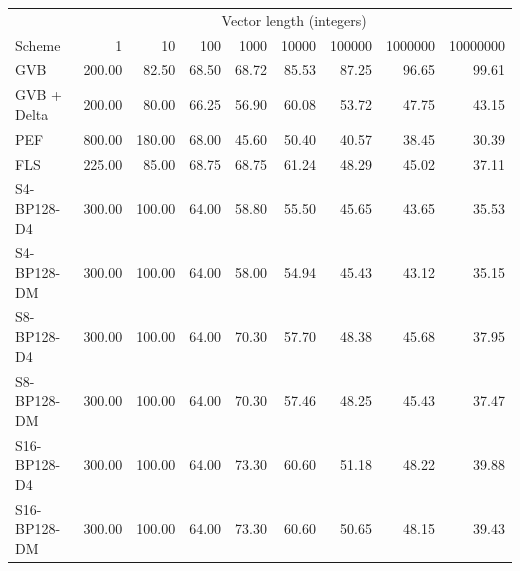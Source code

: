\begin{tabular}{lrrrrrrrr}
\toprule
 & \multicolumn{8}{c}{Vector length (integers)} \\
Scheme & 1 & 10 & 100 & 1000 & 10000 & 100000 & 1000000 & 10000000 \\
\midrule
GVB & 200.00 & 82.50 & 68.50 & 68.72 & 85.53 & 87.25 & 96.65 & 99.61 \\
GVB + Delta & 200.00 & 80.00 & 66.25 & 56.90 & 60.08 & 53.72 & 47.75 & 43.15 \\
PEF & 800.00 & 180.00 & 68.00 & 45.60 & 50.40 & 40.57 & 38.45 & 30.39 \\
FLS & 225.00 & 85.00 & 68.75 & 68.75 & 61.24 & 48.29 & 45.02 & 37.11 \\
S4-BP128-D4 & 300.00 & 100.00 & 64.00 & 58.80 & 55.50 & 45.65 & 43.65 & 35.53 \\
S4-BP128-DM & 300.00 & 100.00 & 64.00 & 58.00 & 54.94 & 45.43 & 43.12 & 35.15 \\
S8-BP128-D4 & 300.00 & 100.00 & 64.00 & 70.30 & 57.70 & 48.38 & 45.68 & 37.95 \\
S8-BP128-DM & 300.00 & 100.00 & 64.00 & 70.30 & 57.46 & 48.25 & 45.43 & 37.47 \\
S16-BP128-D4 & 300.00 & 100.00 & 64.00 & 73.30 & 60.60 & 51.18 & 48.22 & 39.88 \\
S16-BP128-DM & 300.00 & 100.00 & 64.00 & 73.30 & 60.60 & 50.65 & 48.15 & 39.43 \\
\bottomrule
\end{tabular}
